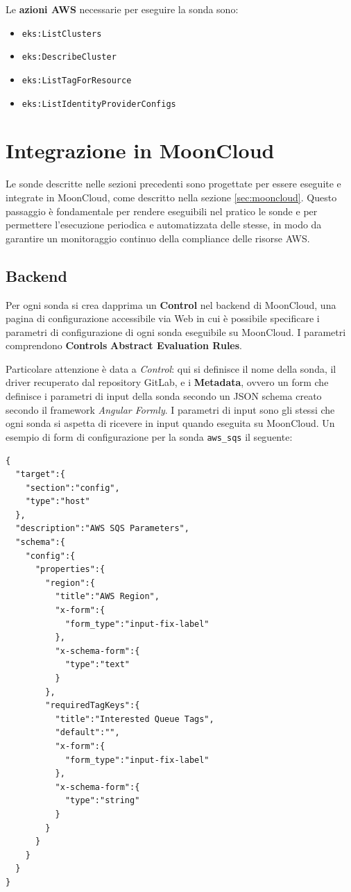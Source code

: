 \vspace{1em}

\noindent Le \textbf{azioni AWS} necessarie per eseguire la sonda sono:
\begin{itemize}
    \item \texttt{eks:ListClusters}
    \item \texttt{eks:DescribeCluster}
    \item \texttt{eks:ListTagForResource}
    \item \texttt{eks:ListIdentityProviderConfigs}
\end{itemize}

\section{Integrazione in MoonCloud}
\label{sec:integrazione}

Le sonde descritte nelle sezioni precedenti sono progettate per essere eseguite e integrate in MoonCloud, come descritto nella sezione \ref{sec:mooncloud}. Questo passaggio è fondamentale per rendere eseguibili nel pratico le sonde e per permettere l'esecuzione periodica e automatizzata delle stesse, in modo da garantire un monitoraggio continuo della compliance delle risorse AWS. 

\subsection{Backend}
\label{sec:backend}

Per ogni sonda si crea dapprima un \textbf{Control} nel backend di MoonCloud, una pagina di configurazione accessibile via Web in cui è possibile specificare i parametri di configurazione di ogni sonda eseguibile su MoonCloud. I parametri comprendono \textbf{Controls} \textbf{Abstract Evaluation Rules}. 

Particolare attenzione è data a \textit{Control}: qui si definisce il nome della sonda, il driver recuperato dal repository GitLab, e i \textbf{Metadata}, ovvero un form che definisce i parametri di input della sonda secondo un JSON schema creato secondo il framework \textit{Angular Formly}. I parametri di input sono gli stessi che ogni sonda si aspetta di ricevere in input quando eseguita su MoonCloud. Un esempio di form di configurazione per la sonda \texttt{aws\_sqs} il seguente:

\begin{lstlisting}[style=myjson, caption={Form di configurazione per la sonda \texttt{aws\_sqs}}]
{
  "target":{
    "section":"config",
    "type":"host"
  },
  "description":"AWS SQS Parameters",
  "schema":{
    "config":{
      "properties":{
        "region":{
          "title":"AWS Region",
          "x-form":{
            "form_type":"input-fix-label"
          },
          "x-schema-form":{
            "type":"text"
          }
        },
        "requiredTagKeys":{
          "title":"Interested Queue Tags",
          "default":"",
          "x-form":{
            "form_type":"input-fix-label"
          },
          "x-schema-form":{
            "type":"string"
          }
        }
      }
    }
  }
}
\end{lstlisting}


